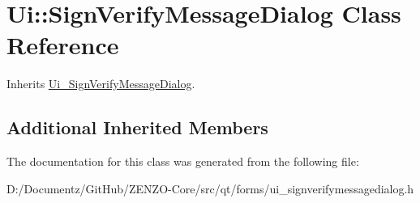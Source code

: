 \hypertarget{class_ui_1_1_sign_verify_message_dialog}{}\section{Ui\+::Sign\+Verify\+Message\+Dialog Class Reference}
\label{class_ui_1_1_sign_verify_message_dialog}


Inherits \mbox{\hyperlink{class_ui___sign_verify_message_dialog}{Ui\+\_\+\+Sign\+Verify\+Message\+Dialog}}.

\subsection*{Additional Inherited Members}


The documentation for this class was generated from the following file\+:\begin{DoxyCompactItemize}
\item 
D\+:/\+Documentz/\+Git\+Hub/\+Z\+E\+N\+Z\+O-\/\+Core/src/qt/forms/ui\+\_\+signverifymessagedialog.\+h\end{DoxyCompactItemize}
